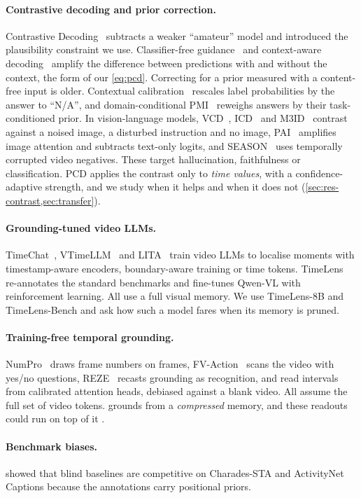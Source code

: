 \paragraph{Contrastive decoding and prior correction.}
Contrastive Decoding~\cite{contrastivedecoding} subtracts a weaker ``amateur'' model and introduced the plausibility
constraint we use. Classifier-free guidance~\cite{cfglm} and context-aware decoding~\cite{cad} amplify the difference
between predictions with and without the context, the form of our \cref{eq:pcd}. Correcting for a prior measured with
a content-free input is older. Contextual calibration~\cite{calibratebeforeuse} rescales label probabilities by the
answer to ``N/A'', and domain-conditional PMI~\cite{dcpmi} reweighs answers by their task-conditioned prior. In
vision-language models, VCD~\cite{vcd}, ICD~\cite{icd} and M3ID~\cite{m3id} contrast against a noised image, a
disturbed instruction and no image, PAI~\cite{pai} amplifies image attention and subtracts text-only logits, and
SEASON~\cite{season} uses temporally corrupted video negatives. These target hallucination, faithfulness or
classification. PCD applies the contrast only to \emph{time values}, with a confidence-adaptive strength, and we study
when it helps and when it does not (\cref{sec:res-contrast,sec:transfer}).

\paragraph{Grounding-tuned video LLMs.}
TimeChat~\cite{timechat}, VTimeLLM~\cite{vtimellm} and LITA~\cite{lita} train video LLMs to localise moments with
timestamp-aware encoders, boundary-aware training or time tokens. TimeLens~\cite{timelens} re-annotates the standard
benchmarks and fine-tunes Qwen-VL with reinforcement learning. All use a full visual memory. We use TimeLens-8B and
TimeLens-Bench and ask how such a model fares when its memory is pruned.

\paragraph{Training-free temporal grounding.}
NumPro~\cite{numpro} draws frame numbers on frames, FV-Action~\cite{fvaction} scans the video with yes/no questions,
REZE~\cite{reze} recasts grounding as recognition, and \citet{knowwhen} read intervals from calibrated attention heads,
debiased against a blank video. All assume the full set of video tokens. \method grounds from a \emph{compressed}
memory, and these readouts could run on top of it .

\paragraph{Benchmark biases.}
\citet{otani2020uncovering} showed that blind baselines are competitive on Charades-STA and ActivityNet Captions
because the annotations carry positional priors.
